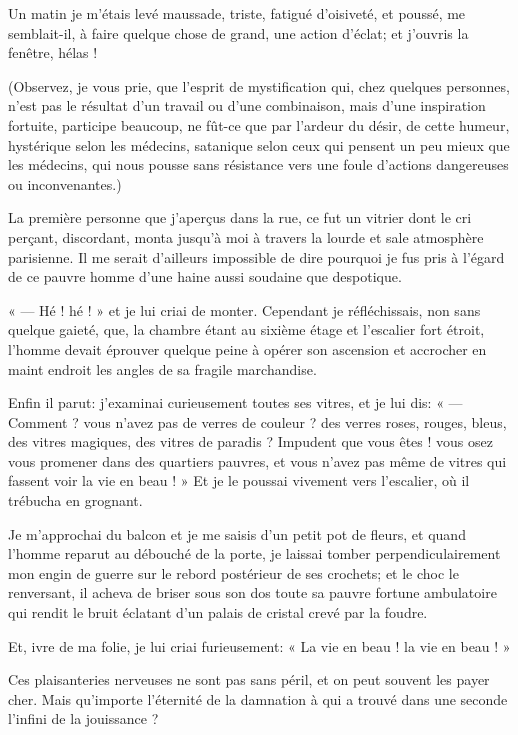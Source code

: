 Un matin je m’étais levé maussade, triste, fatigué
d’oisiveté, et poussé, me semblait{}-il, à faire
quelque chose de grand, une action d’éclat; et
j’ouvris la fenêtre, hélas !

(Observez, je vous prie, que l’esprit de mystification
qui, chez quelques personnes, n’est pas le résultat
d’un travail ou d’une combinaison,
mais d’une inspiration fortuite, participe beaucoup,
ne fût{}-ce que par l’ardeur du désir, de cette
humeur, hystérique selon les médecins, satanique selon ceux qui pensent
un peu mieux que les médecins, qui nous pousse sans résistance vers une
foule d’actions dangereuses ou inconvenantes.)

La première personne que j’aperçus dans la rue, ce fut
un vitrier dont le cri perçant, discordant, monta
jusqu’à moi à travers la lourde et sale atmosphère
parisienne. Il me serait d’ailleurs impossible de dire
pourquoi je fus pris à l’égard de ce pauvre homme
d’une haine aussi soudaine que despotique.

« --- Hé ! hé ! » et je lui criai de monter. Cependant je réfléchissais,
non sans quelque gaieté, que, la chambre étant au sixième étage et
l’escalier fort étroit, l’homme
devait éprouver quelque peine à opérer son ascension et accrocher en
maint endroit les angles de sa fragile marchandise.

Enfin il parut: j’examinai curieusement toutes ses
vitres, et je lui dis: « --- Comment ? vous n’avez pas
de verres de couleur ? des verres roses, rouges, bleus, des vitres
magiques, des vitres de paradis ? Impudent que vous êtes ! vous osez
vous promener dans des quartiers pauvres, et vous
n’avez pas même de vitres qui fassent voir la vie en
beau ! » Et je le poussai vivement vers l’escalier, où
il trébucha en grognant.

Je m’approchai du balcon et je me saisis
d’un petit pot de fleurs, et quand
l’homme reparut au débouché de la porte, je laissai
tomber perpendiculairement mon engin de guerre sur le rebord postérieur
de ses crochets; et le choc le renversant, il acheva de briser sous son
dos toute sa pauvre fortune ambulatoire qui rendit le bruit éclatant
d’un palais de cristal crevé par la foudre.

Et, ivre de ma folie, je lui criai furieusement: « La vie en beau ! la
vie en beau ! »

Ces plaisanteries nerveuses ne sont pas sans péril, et on peut souvent
les payer cher. Mais qu’importe
l’éternité de la damnation à qui a trouvé dans une
seconde l’infini de la jouissance ?

